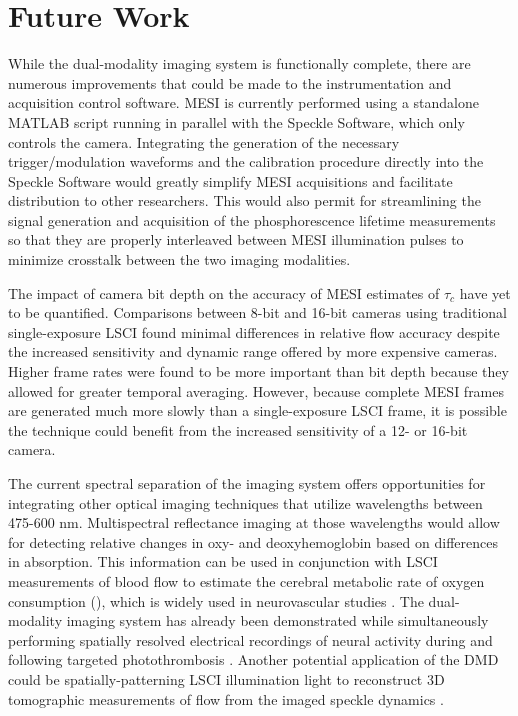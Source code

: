 \section{Future Work}

While the dual-modality imaging system is functionally complete, there are numerous improvements that could be made to the instrumentation and acquisition control software. MESI is currently performed using a standalone MATLAB script running in parallel with the Speckle Software, which only controls the camera. Integrating the generation of the necessary trigger/modulation waveforms and the calibration procedure directly into the Speckle Software would greatly simplify MESI acquisitions and facilitate distribution to other researchers. This would also permit for streamlining the signal generation and acquisition of the phosphorescence lifetime measurements so that they are properly interleaved between MESI illumination pulses to minimize crosstalk between the two imaging modalities.

The impact of camera bit depth on the accuracy of MESI estimates of $\tau_c$ have yet to be quantified. Comparisons between 8-bit and 16-bit cameras using traditional single-exposure LSCI found minimal differences in relative flow accuracy \cite{Richards:2013bi, Richards:2016hy} despite the increased sensitivity and dynamic range offered by more expensive cameras. Higher frame rates were found to be more important than bit depth because they allowed for greater temporal averaging. However, because complete MESI frames are generated much more slowly than a single-exposure LSCI frame, it is possible the technique could benefit from the increased sensitivity of a 12- or 16-bit camera.

The current spectral separation of the imaging system offers opportunities for integrating other optical imaging techniques that utilize wavelengths between 475-600 nm. Multispectral reflectance imaging at those wavelengths would allow for detecting relative changes in oxy- and deoxyhemoglobin based on differences in absorption. This information can be used in conjunction with LSCI measurements of blood flow to estimate the cerebral metabolic rate of oxygen consumption (), which is widely used in neurovascular studies \cite{Jones:2008gb}. The dual-modality imaging system has already been demonstrated while simultaneously performing spatially resolved electrical recordings of neural activity during and following targeted photothrombosis \cite{Luan:2018fq}. Another potential application of the DMD could be spatially-patterning LSCI illumination light to reconstruct 3D tomographic measurements of flow from the imaged speckle dynamics \cite{Huang:2017gm}.

